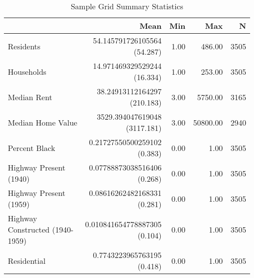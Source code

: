 \begin{table}[h]
\centering
\caption{Sample Grid Summary Statistics}
\label{tab:summary_stats}
\begin{tabular*}{\linewidth}{@{\extracolsep{\fill}}l*{4}{r}}
\toprule
 & Mean & Min & Max & N \\
\midrule
Residents & \makecell[tr]{54.145791726105564 \\ (54.287)} & 1.00 & 486.00 & 3505 \\
Households & \makecell[tr]{14.971469329529244 \\ (16.334)} & 1.00 & 253.00 & 3505 \\
Median Rent & \makecell[tr]{38.24913112164297 \\ (210.183)} & 3.00 & 5750.00 & 3165 \\
Median Home Value & \makecell[tr]{3529.394047619048 \\ (3117.181)} & 3.00 & 50800.00 & 2940 \\
Percent Black & \makecell[tr]{0.21727550500259102 \\ (0.383)} & 0.00 & 1.00 & 3505 \\
Highway Present (1940) & \makecell[tr]{0.07788873038516406 \\ (0.268)} & 0.00 & 1.00 & 3505 \\
Highway Present (1959) & \makecell[tr]{0.08616262482168331 \\ (0.281)} & 0.00 & 1.00 & 3505 \\
Highway Constructed (1940-1959) & \makecell[tr]{0.010841654778887305 \\ (0.104)} & 0.00 & 1.00 & 3505 \\
Residential & \makecell[tr]{0.7743223965763195 \\ (0.418)} & 0.00 & 1.00 & 3505 \\
\bottomrule
\end{tabular*}
\end{table}

